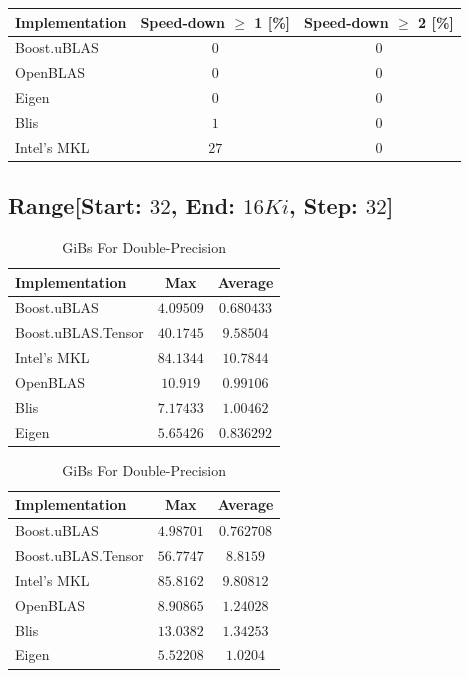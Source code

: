 \begin{table}[ht]
    \begin{tabular}{|l|c|c|}
        \hline
        \textbf{Implementation} & \textbf{Speed-down $\geq$ 1 [\%]} & \textbf{Speed-down $\geq$ 2 [\%]}\\
        \hline
        Boost.uBLAS & $0$ & $0$ \\
        \hline
        OpenBLAS    & $0$ & $0$ \\
        \hline
        Eigen       & $0$ & $0$ \\
        \hline
        Blis        & $1$ & $0$ \\
        \hline
        Intel's MKL & $27$ & $0$ \\
        \hline
    \end{tabular}
\end{table}

\clearpage
\subsection*{Range[Start: $32$, End: $16Ki$, Step: $32$]}

\begin{table}[ht]
    \centering
    \caption{GiBs For Single-Precision}
    \begin{tabular}{|l|c|c|}
        \hline
        \textbf{Implementation} & \textbf{Max} & \textbf{Average}\\
        \hline
        Boost.uBLAS         & $4.09509$& $0.680433$ \\
        \hline
        Boost.uBLAS.Tensor  & $40.1745$& $9.58504$ \\
        \hline
        Intel's MKL         & $84.1344$& $10.7844$ \\
        \hline
        OpenBLAS            & $10.919$& $0.99106$ \\
        \hline
        Blis                & $7.17433$& $1.00462$ \\
        \hline
        Eigen               & $5.65426$& $0.836292$ \\
        \hline
    \end{tabular}

    \vspace*{1 cm}

    \centering
    \caption{GiBs For Double-Precision}
    \begin{tabular}{|l|c|c|}
        \hline
        \textbf{Implementation} & \textbf{Max} & \textbf{Average}\\
        \hline
        Boost.uBLAS         & $4.98701$& $0.762708$ \\
        \hline
        Boost.uBLAS.Tensor  & $56.7747$& $8.8159$ \\
        \hline
        Intel's MKL         & $85.8162$& $9.80812$ \\
        \hline
        OpenBLAS            & $8.90865$& $1.24028$ \\
        \hline
        Blis                & $13.0382$& $1.34253$ \\
        \hline
        Eigen               & $5.52208$& $1.0204$ \\
        \hline
    \end{tabular}
\end{table}

